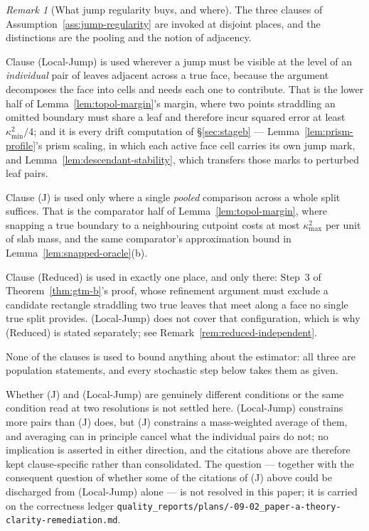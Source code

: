 \documentclass[11pt]{article}
\theoremstyle{plain}
\theoremstyle{definition}
\theoremstyle{remark}
\newtheorem{remark}[theorem]{Remark}
\begin{document}
\begin{remark}[What jump regularity buys, and where]\label{rem:jump-role}
The three clauses of Assumption~\ref{ass:jump-regularity} are invoked at
disjoint places, and the distinctions are the pooling and the notion of
adjacency.

Clause (Local-Jump) is used wherever a jump must be visible at the level of an
\emph{individual} pair of leaves adjacent across a true face, because the
argument decomposes the face into cells and needs each one to contribute. That
is the lower half of Lemma~\ref{lem:topol-margin}'s margin, where two points
straddling an omitted boundary must share a leaf and therefore incur squared
error at least \(\kappa_{\min}^2/4\); and it is every drift computation of
\S\ref{sec:stageb} --- Lemma~\ref{lem:prism-profile}'s prism scaling, in which
each active face cell carries its own jump mark, and
Lemma~\ref{lem:descendant-stability}, which transfers those marks to perturbed
leaf pairs.

Clause (J) is used only where a single \emph{pooled} comparison across a whole
split suffices. That is the comparator half of
Lemma~\ref{lem:topol-margin}, where snapping a true boundary to a neighbouring
cutpoint costs at most \(\kappa_{\max}^2\) per unit of slab mass, and the same
comparator's approximation bound in
Lemma~\ref{lem:snapped-oracle}(b).

Clause (Reduced) is used in exactly one place, and only there: Step~3 of
Theorem~\ref{thm:gtm-b}'s proof, whose refinement argument must exclude a
candidate rectangle straddling two true leaves that meet along a face no
single true split provides. (Local-Jump) does not cover that configuration,
which is why (Reduced) is stated separately; see
Remark~\ref{rem:reduced-independent}.

None of the clauses is used to bound anything about the estimator: all three
are population statements, and every stochastic step below takes them as
given.

Whether (J) and (Local-Jump) are genuinely different conditions or the same
condition read at two resolutions is not settled here. (Local-Jump) constrains
more pairs than (J) does, but (J) constrains a mass-weighted average of them,
and averaging can in principle cancel what the individual pairs do not; no
implication is asserted in either direction, and the citations above are
therefore kept clause-specific rather than consolidated. The question ---
together with the consequent question of whether some of the citations of (J)
above could be discharged from (Local-Jump) alone --- is not resolved in this
paper; it is carried on the correctness ledger
\texttt{quality\_reports/\allowbreak plans/-09-02\_paper-a-theory-clarity-remediation.md}.
\end{remark}
\end{document}

